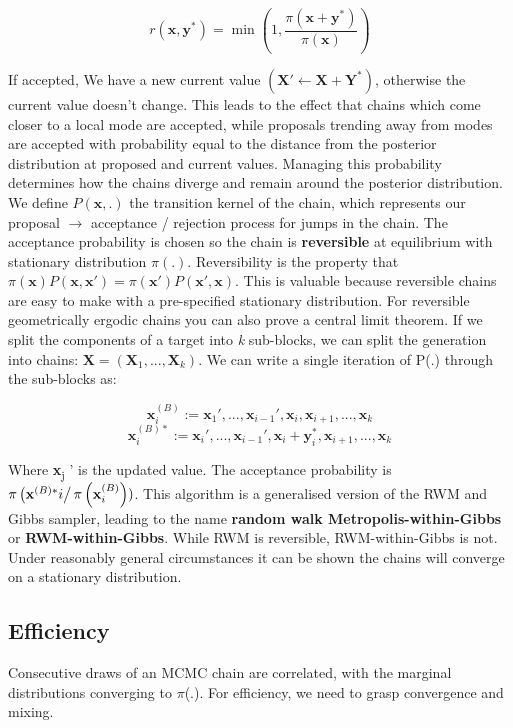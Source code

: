 \documentclass[a4paper]{article}
\begin{document}
\[r(\mathbf{x}, \mathbf{y}^*) = \min \left(1, \frac{\pi (\mathbf{x} + \mathbf{y}^*)}{\pi( \mathbf{x})} \right) \]

If accepted, We have a new current value \((\mathbf{X}' \leftarrow \mathbf{X} + \mathbf{Y}^*)\), otherwise the current value doesn't change. This leads to the effect that chains which come closer to a local mode are accepted, while proposals trending away from modes are accepted with probability equal to the distance from the posterior distribution at proposed and current values. Managing this probability determines how the chains diverge and remain around the posterior distribution. We define \(P(\mathbf{x}, .)\) the transition kernel of the chain, which represents our proposal \(\rightarrow\) acceptance / rejection process for jumps in the chain. The acceptance probability is chosen so the chain is \textbf{reversible} at equilibrium with stationary distribution \(\pi (.)\). Reversibility is the property that \(\pi(\mathbf{x})P(\mathbf{x}, \mathbf{x}') = \pi (\mathbf{x}')P(\mathbf{x}', \mathbf{x})\). This is valuable because reversible chains are easy to make with a pre-specified stationary distribution. For reversible geometrically ergodic chains you can also prove a central limit theorem. If we split the components of a target into \emph{k} sub-blocks, we can split the generation into chains: \(\mathbf{X} = (\mathbf{X}_1, ..., \mathbf{X}_k)\). We can write a single iteration of P(.) through the sub-blocks as:

\[\mathbf{x}^{(B)}_i := \mathbf{x}_1 ',...,\mathbf{x}_{i-1}', \mathbf{x}_i, \mathbf{x}_{i+1},..., \mathbf{x}_k \]
\[\mathbf{x}^{(B)*}_i := \mathbf{x}_i ',...,\mathbf{x}_{i-1}', \mathbf{x}_i + \mathbf{y}^*_i, \mathbf{x}_{i+1},..., \mathbf{x}_k \]

Where \textbf{x}\textsubscript{j} ' is the updated value. The acceptance probability is \(\pi \left(\mathbf{x}^{(B)*}{i} \right / \pi \left(\mathbf{x}^{(B)}_i \right))\). This algorithm is a generalised version of the RWM and Gibbs sampler, leading to the name \textbf{random walk Metropolis-within-Gibbs} or \textbf{RWM-within-Gibbs}. While RWM is reversible, RWM-within-Gibbs is not. Under reasonably general circumstances it can be shown the chains will converge on a stationary distribution.
\subsection{Efficiency}
\label{sec:org8a12e7e}
Consecutive draws of an MCMC chain are correlated, with the marginal distributions converging to \(\pi\)(.). For efficiency, we need to grasp convergence and mixing.
\end{document}
